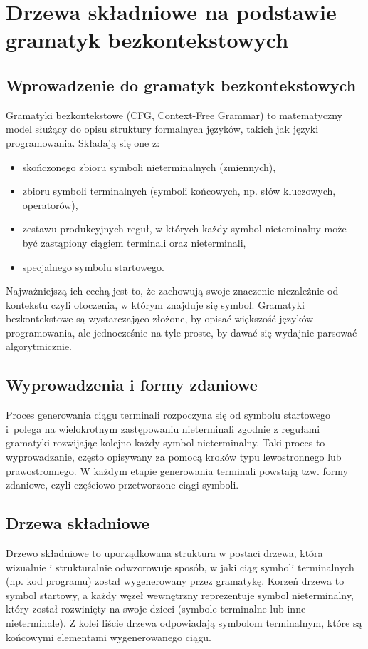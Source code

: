 \documentclass[12pt,twoside]{article}
\begin{document}
\clearpage

\section{Drzewa składniowe na podstawie gramatyk bezkontekstowych}
\subsection{Wprowadzenie do gramatyk bezkontekstowych}
Gramatyki bezkontekstowe (CFG, Context-Free Grammar) to matematyczny model służący do opisu struktury formalnych języków, takich jak języki programowania. Składają się one z:
\begin{itemize}[label=\textbullet, leftmargin=1.25cm]
   \item skończonego zbioru symboli nieterminalnych (zmiennych),
   \item zbioru symboli terminalnych (symboli końcowych, np. słów kluczowych, operatorów),
   \item zestawu produkcyjnych reguł, w których każdy symbol nieteminalny może być zastąpiony ciągiem terminali oraz nieterminali, 
   \item specjalnego symbolu startowego.
\end{itemize} 
Najważniejszą ich cechą jest to, że zachowują swoje znaczenie niezależnie od kontekstu czyli otoczenia, w którym znajduje się symbol. Gramatyki bezkontekstowe są wystarczająco złożone, by opisać większość języków programowania, ale jednocześnie na tyle proste, by dawać się wydajnie parsować algorytmicznie.\cite{contextFreeGrammar}

\subsection{Wyprowadzenia i formy zdaniowe}
Proces generowania ciągu terminali rozpoczyna się od symbolu startowego i~polega na wielokrotnym zastępowaniu nieterminali zgodnie z regułami gramatyki rozwijając kolejno każdy symbol nieterminalny\cite{contextFreeGrammar}. Taki proces to wyprowadzanie, często opisywany za pomocą kroków typu lewostronnego lub prawostronnego. W każdym etapie generowania terminali powstają tzw. formy zdaniowe, czyli częściowo przetworzone ciągi symboli.

\subsection{Drzewa składniowe}
Drzewo składniowe to uporządkowana struktura w postaci drzewa, która wizualnie i strukturalnie odwzorowuje sposób, w jaki ciąg symboli terminalnych (np. kod programu) został wygenerowany przez gramatykę. Korzeń drzewa to symbol startowy, a każdy węzeł wewnętrzny reprezentuje symbol nieterminalny, który został rozwinięty na swoje dzieci (symbole terminalne lub inne nieterminale). Z kolei liście drzewa odpowiadają symbolom terminalnym, które są końcowymi elementami wygenerowanego ciągu.
\end{document}
